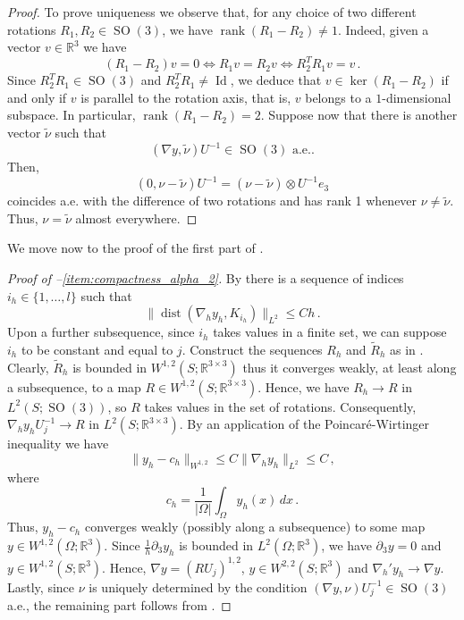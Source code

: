 \documentclass{article}
\theoremstyle{plain}
\theoremstyle{plain}
\theoremstyle{plain}
\theoremstyle{plain}
\theoremstyle{plain}
\theoremstyle{definition}
\theoremstyle{definition}
\renewcommand{\r}{\mathbb{R}}
\DeclareMathOperator{\Id}{Id}
\DeclareMathOperator{\SO}{SO}
\DeclareMathOperator{\dist}{dist}
\DeclareMathOperator{\rank}{rank}
\begin{document}
\begin{proof}
    To prove uniqueness we observe that, for any choice of two different rotations $R_1, R_2 \in \SO(3)$, we have $\rank(R_1-R_2) \neq 1$. Indeed, given a vector $v \in \r^3$ we have 
    \[
    	(R_1 - R_2)v = 0 \iff R_1v = R_2 v \iff R_2^T R_1 v = v \,.
    \]
    Since $R_2^T R_1 \in \SO(3)$ and $R_2^TR_1 \neq \Id$, we deduce that $v \in \ker(R_1 - R_2)$ if and only if $v$ is parallel to the rotation axis, that is, $v$ belongs to a $1$-dimensional subspace. In particular, $\rank(R_1 - R_2) = 2$.
    Suppose now that there is another vector $\tilde \nu$ such that
    \[
    	(\nabla y, \tilde \nu)U^{-1} \in \SO(3) \, \, \text{a.e..}
    \]
    Then, 
    \[
    	 (0, \nu - \tilde \nu)U^{-1} = (\nu - \tilde \nu) \otimes U^{-1} e_3
    \]
    coincides a.e. with the difference of two rotations and has rank 1 whenever $\nu \neq \tilde \nu$. Thus, $\nu = \tilde \nu$ almost everywhere.
\end{proof}

We move now to the proof of the first part of .

\begin{proof}[Proof of --\ref{item:compactness_alpha_2}]
    By  there is a sequence of indices $i_h \in \{1, \dots, l\}$ such that
    \[
        \|\dist(\nabla_h y_h, K_{i_h})\|_{L^2} \leq Ch \,.
    \]
    Upon a further subsequence, since $ i_{h} $ takes values in a finite set, we can suppose $i_h$ to be constant and equal to $j$. Construct the sequences $R_h$ and $\tilde R_h$ as in . Clearly, $\tilde R_h$ is bounded in $W^{1,2}(S; \r^{3 \times 3})$ thus it converges weakly, at least along a subsequence, to a map $R \in W^{1,2}(S; \r^{3 \times 3})$. Hence, we have $R_h \to R$ in $L^2(S; \SO(3))$, so $R$ takes values in the set of rotations. Consequently, $\nabla_h y_h U_j^{-1} \to R$ in $ L^{2}(S; \r^{3 \times 3}) $. By an application of the Poincaré-Wirtinger inequality we have 
    \[
    	\|y_h - c_h\|_{W^{1, 2}} \leq C\|\nabla_h y_h\|_{L^2} \leq C \,,
    \]
    where
    \[
    	c_h = \dfrac{1}{|\Omega|}\int_\Omega y_h(x) \, dx \,. 
    \]
    Thus, $y_h - c_h$ converges weakly (possibly along a subsequence) to some map $y \in W^{1, 2}(\Omega; \r^3)$. Since $\frac{1}{h} \partial_3 y_h$ is bounded in $L^2(\Omega; \r^3)$, we have $\partial_3 y = 0$ and $y \in W^{1, 2}(S; \r^3)$. Hence, $\nabla y = (RU_j)^{1, 2}$, $y \in W^{2, 2}(S; \r^3)$ and $\nabla_h' y_h \to \nabla y$. Lastly, since $\nu$ is uniquely determined by the condition $(\nabla y, \nu)U_j^{-1} \in \SO(3)$ a.e., the remaining part follows from .
\end{proof}
\end{document}
